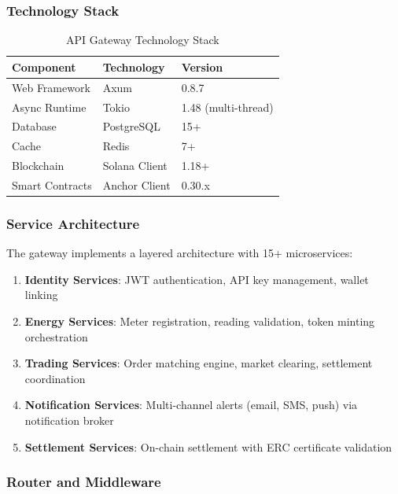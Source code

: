 \documentclass[conference]{IEEEtran}
\begin{document}
\subsubsection{Technology Stack}

\begin{table}[htbp]
\caption{API Gateway Technology Stack}
\begin{center}
\begin{tabular}{lll}
\toprule
\textbf{Component} & \textbf{Technology} & \textbf{Version} \\
\midrule
Web Framework & Axum & 0.8.7 \\
Async Runtime & Tokio & 1.48 (multi-thread) \\
Database & PostgreSQL & 15+ \\
Cache & Redis & 7+ \\
Blockchain & Solana Client & 1.18+ \\
Smart Contracts & Anchor Client & 0.30.x \\
\bottomrule
\end{tabular}
\label{tab:gateway-stack}
\end{center}
\end{table}

\subsubsection{Service Architecture}

The gateway implements a layered architecture with 15+ microservices:

\begin{enumerate}
    \item \textbf{Identity Services}: JWT authentication, API key management, wallet linking
    \item \textbf{Energy Services}: Meter registration, reading validation, token minting orchestration
    \item \textbf{Trading Services}: Order matching engine, market clearing, settlement coordination
    \item \textbf{Notification Services}: Multi-channel alerts (email, SMS, push) via notification broker
    \item \textbf{Settlement Services}: On-chain settlement with ERC certificate validation
\end{enumerate}

\subsubsection{Router and Middleware}
\end{document}
